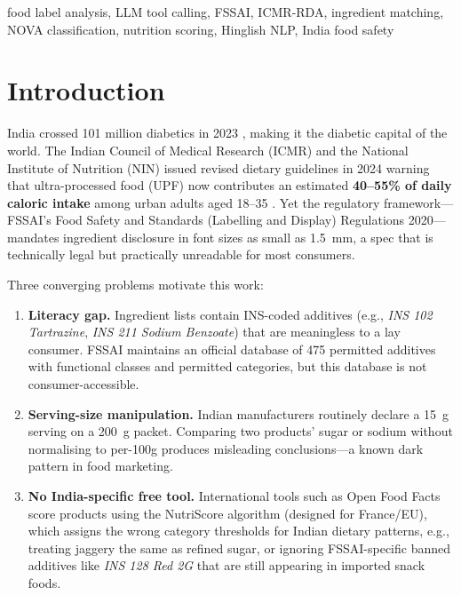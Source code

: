 \documentclass[conference]{IEEEtran}
\begin{document}
\begin{IEEEkeywords}
food label analysis, LLM tool calling, FSSAI, ICMR-RDA, ingredient matching,
NOVA classification, nutrition scoring, Hinglish NLP, India food safety
\end{IEEEkeywords}

\section{Introduction}

India crossed 101 million diabetics in 2023 \cite{lancet_diabetes}, making it the
diabetic capital of the world. The Indian Council of Medical Research (ICMR) and
the National Institute of Nutrition (NIN) issued revised dietary guidelines in 2024
warning that ultra-processed food (UPF) now contributes an estimated
\textbf{40--55\% of daily caloric intake} among urban adults aged 18--35 \cite{icmr_nin_2024}.
Yet the regulatory framework---FSSAI's Food Safety and Standards (Labelling and
Display) Regulations 2020---mandates ingredient disclosure in font sizes as small
as 1.5~mm, a spec that is technically legal but practically unreadable for most consumers.

Three converging problems motivate this work:

\begin{enumerate}
  \item \textbf{Literacy gap.} Ingredient lists contain INS-coded additives
        (e.g., \textit{INS 102 Tartrazine}, \textit{INS 211 Sodium Benzoate})
        that are meaningless to a lay consumer. FSSAI maintains an official
        database of 475 permitted additives with functional classes and permitted
        categories, but this database is not consumer-accessible.
  \item \textbf{Serving-size manipulation.} Indian manufacturers routinely declare
        a 15~g serving on a 200~g packet. Comparing two products' sugar or sodium
        without normalising to per-100g produces misleading conclusions---a known
        dark pattern in food marketing.
  \item \textbf{No India-specific free tool.} International tools such as Open Food
        Facts score products using the NutriScore algorithm (designed for France/EU),
        which assigns the wrong category thresholds for Indian dietary patterns,
        e.g., treating jaggery the same as refined sugar, or ignoring FSSAI-specific
        banned additives like \textit{INS 128 Red 2G} that are still appearing
        in imported snack foods.
\end{enumerate}
\end{document}
